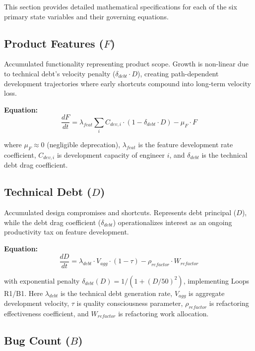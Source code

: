 \documentclass[alpha-refs]{wiley-article}
\begin{document}
This section provides detailed mathematical specifications for each of the six primary state variables and their governing equations.

\subsection{Product Features ($F$)}

Accumulated functionality representing product scope. Growth is non-linear due to technical debt's velocity penalty ($\delta_{debt} \cdot D$), creating path-dependent development trajectories where early shortcuts compound into long-term velocity loss.

\textbf{Equation:}
\begin{equation}
\frac{dF}{dt} = \lambda_{feat} \sum_i C_{dev,i} \cdot (1 - \delta_{debt} \cdot D) - \mu_F \cdot F
\end{equation}

\noindent where $\mu_F \approx 0$ (negligible deprecation), $\lambda_{feat}$ is the feature development rate coefficient, $C_{dev,i}$ is development capacity of engineer $i$, and $\delta_{debt}$ is the technical debt drag coefficient.

\subsection{Technical Debt ($D$)}

Accumulated design compromises and shortcuts. Represents debt principal ($D$), while the debt drag coefficient ($\delta_{debt}$) operationalizes interest as an ongoing productivity tax on feature development.

\textbf{Equation:}
\begin{equation}
\frac{dD}{dt} = \lambda_{debt} \cdot V_{agg} \cdot (1 - \tau) - \rho_{refactor} \cdot W_{refactor}
\end{equation}

\noindent with exponential penalty $\delta_{debt}(D) = 1/(1+(D/50)^2)$, implementing Loops R1/B1. Here $\lambda_{debt}$ is the technical debt generation rate, $V_{agg}$ is aggregate development velocity, $\tau$ is quality consciousness parameter, $\rho_{refactor}$ is refactoring effectiveness coefficient, and $W_{refactor}$ is refactoring work allocation.

\subsection{Bug Count ($B$)}
\end{document}
